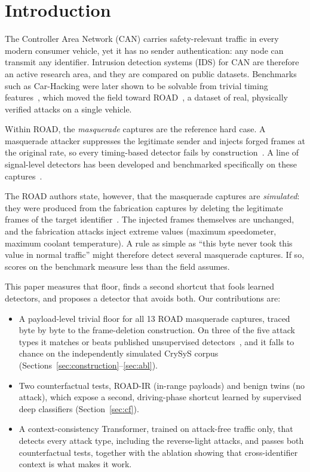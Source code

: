 \documentclass[conference]{IEEEtran}
\begin{document}
\section{Introduction}
The Controller Area Network (CAN) carries safety-relevant traffic in every modern consumer vehicle, yet it has no sender authentication: any node can transmit any identifier. Intrusion detection systems (IDS) for CAN are therefore an active research area, and they are compared on public datasets. Benchmarks such as Car-Hacking were later shown to be solvable from trivial timing features~\cite{blevins2021,heydari2026}, which moved the field toward ROAD~\cite{verma2024}, a dataset of real, physically verified attacks on a single vehicle.

Within ROAD, the \emph{masquerade} captures are the reference hard case. A masquerade attacker suppresses the legitimate sender and injects forged frames at the original rate, so every timing-based detector fails by construction~\cite{blevins2021}. A line of signal-level detectors has been developed and benchmarked specifically on these captures~\cite{moriano2022,moriano2026jisa,marfo2025,liu2026mids,hegde2026}.

The ROAD authors state, however, that the masquerade captures are \emph{simulated}: they were produced from the fabrication captures by deleting the legitimate frames of the target identifier~\cite{verma2024}. The injected frames themselves are unchanged, and the fabrication attacks inject extreme values (maximum speedometer, maximum coolant temperature). A rule as simple as ``this byte never took this value in normal traffic'' might therefore detect several masquerade captures. If so, scores on the benchmark measure less than the field assumes.

This paper measures that floor, finds a second shortcut that fools learned detectors, and proposes a detector that avoids both. Our contributions are:
\begin{itemize}
\item A payload-level trivial floor for all 13 ROAD masquerade captures, traced byte by byte to the frame-deletion construction. On three of the five attack types it matches or beats published unsupervised detectors~\cite{moriano2026jisa}, and it falls to chance on the independently simulated CrySyS corpus (Sections~\ref{sec:construction}--\ref{sec:abl}).
\item Two counterfactual tests, ROAD-IR (in-range payloads) and benign twins (no attack), which expose a second, driving-phase shortcut learned by supervised deep classifiers (Section~\ref{sec:cf}).
\item A context-consistency Transformer, trained on attack-free traffic only, that detects every attack type, including the reverse-light attacks, and passes both counterfactual tests, together with the ablation showing that cross-identifier context is what makes it work.
\end{itemize}
\end{document}
